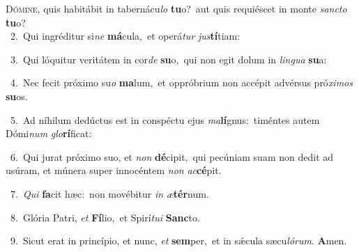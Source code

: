 \lettrine{\initial\textcolor{\initialcolor}{D}}{ómine,} quis habitábit in tabernácu\textit{lo} \textbf{tu}\-o?~\star aut quis requiéscet in monte \textit{sanc}\-\textit{to} \textbf{tu}\-o?\\
{\numbfont\textcolor{\numbcolor}{~2.}}~Qui ingréditur si\textit{ne} \textbf{má}\-cula,~\star et operá\textit{tur} \textit{jus}\-\textbf{tí}tiam:\par
{\numbfont\textcolor{\numbcolor}{~3.}}~Qui lóquitur veritátem in cor\textit{de} \textbf{su}\-o,~\star qui non egit dolum in \textit{lin}\-\textit{gua} \textbf{su}\-a:\par
{\numbfont\textcolor{\numbcolor}{~4.}}~Nec fecit próximo su\textit{o} \textbf{ma}\-lum,~\star et oppróbrium non accépit advérsus pró\-\textit{xi}\-\textit{mos} \textbf{su}\-os.\par
{\numbfont\textcolor{\numbcolor}{~5.}}~Ad níhilum dedúctus est in conspéctu ejus \textit{ma}\-\textbf{lí}gnus:~\star timéntes autem Dómi\textit{num} \textit{glo}\-\textbf{rí}ficat:\par
{\numbfont\textcolor{\numbcolor}{~6.}}~Qui jurat próximo suo, et \textit{non} \textbf{dé}\-cipit,~\star qui pecúniam suam non dedit ad usúram, et múnera super innocéntem \textit{non} \textit{ac}\-\textbf{cé}pit.\par
{\numbfont\textcolor{\numbcolor}{~7.}}~\textit{Qui} \textbf{fa}\-cit hæc:~\star non movébitur \textit{in} \textit{æ}\-\textbf{tér}num.\par
{\numbfont\textcolor{\numbcolor}{~8.}}~Glória Patri, \textit{et} \textbf{Fí}\-lio,~\star et Spirí\-\textit{tu}\-\textit{i} \textbf{Sanc}\-to.\par
{\numbfont\textcolor{\numbcolor}{~9.}}~Sicut erat in princípio, et nunc, \textit{et} \textbf{sem}\-per,~\star et in sǽcula sæcu\-\textit{ló}\-\textit{rum}. \textbf{A}\-men.\par
